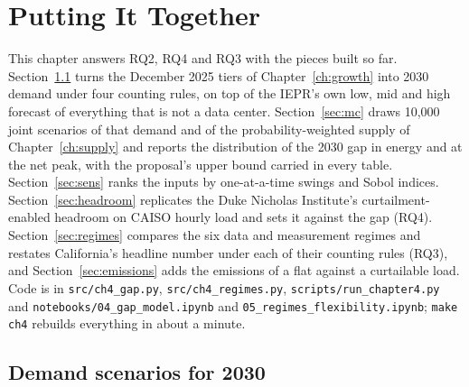 \chapter{Putting It Together}
\label{ch:together}

This chapter answers RQ2, RQ4 and RQ3 with the pieces built so far. Section~\ref{sec:demand} turns the December 2025 tiers of Chapter~\ref{ch:growth} into 2030 demand under four counting rules, on top of the IEPR's own low, mid and high forecast of everything that is not a data center. Section~\ref{sec:mc} draws 10,000 joint scenarios of that demand and of the probability-weighted supply of Chapter~\ref{ch:supply} and reports the distribution of the 2030 gap in energy and at the net peak, with the proposal's upper bound carried in every table. Section~\ref{sec:sens} ranks the inputs by one-at-a-time swings and Sobol indices. Section~\ref{sec:headroom} replicates the Duke Nicholas Institute's curtailment-enabled headroom on CAISO hourly load and sets it against the gap (RQ4). Section~\ref{sec:regimes} compares the six data and measurement regimes and restates California's headline number under each of their counting rules (RQ3), and Section~\ref{sec:emissions} adds the emissions of a flat against a curtailable load. Code is in \texttt{src/ch4\_gap.py}, \texttt{src/ch4\_regimes.py}, \texttt{scripts/run\_chapter4.py} and \texttt{notebooks/04\_gap\_model.ipynb} and \texttt{05\_regimes\_flexibility.ipynb}; \texttt{make ch4} rebuilds everything in about a minute.

\section{Demand scenarios for 2030}
\label{sec:demand}

